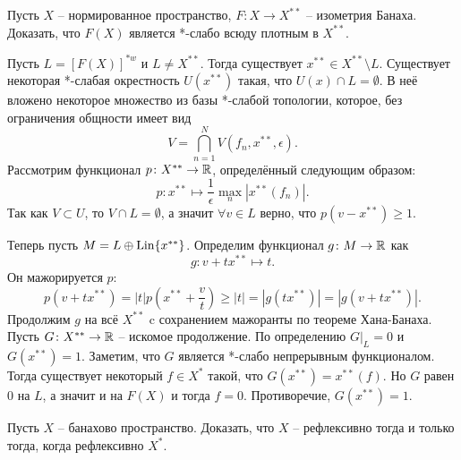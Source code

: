 \begin{task}[T11]
    Пусть $X$ -- нормированное пространство, $F\colon X \to X^{**}$ -- изометрия Банаха.
    Доказать, что $F(X)$ является *-слабо всюду плотным в $X^{**}$.
\end{task}
\begin{solution}
    Пусть $L = [F(X)]^{*w}$ и $L \neq X^{**}$.
    Тогда существует $x^{**} \in X^{**} \setminus L$.
    Существует некоторая *-слабая окрестность $U(x^{**})$ такая, что $U(x) \cap L = \emptyset$.
    В неё вложено некоторое множество из базы *-слабой топологии, которое, без ограничения общности имеет вид
    \[
        V = \bigcap_{n = 1}^{N} V(f_n, x^{**}, \epsilon).
    \]
    Рассмотрим функционал $p\colon X^{**} \to \mathbb{R}$, определённый следующим образом:
    \[
        p\colon x^{**} \mapsto \frac{1}{\epsilon} \max_{n} |x^{**}(f_n)|.
    \]
    Так как $V \subset U $, то $V \cap L = \emptyset$, а значит $\forall v \in L$ верно, что $p(v - x^{**}) \geq 1$.

    Теперь пусть $M = L \oplus \operatorname{Lin}\{x^{**}\}$.
    Определим функционал $g\colon M \to \mathbb{R}$ как
    \[
        g\colon v + tx^{**} \mapsto t.
    \]
    Он мажорируется $p\colon$
    \[
        p(v + tx^{**}) = |t|p\left(x^{**} + \frac{v}{t}\right) \geq |t| = |g(tx^{**})| = |g(v + tx^{**})|.
    \]
    Продолжим $g$ на всё $X^{**}$ c сохранением мажоранты по теореме Хана-Банаха.
    Пусть $G\colon X^{**} \to \mathbb{R}$ -- искомое продолжение.
    По определению $G|_{L} = 0$ и $G(x^{**}) = 1$.
    Заметим, что $G$ является *-слабо непрерывным функционалом.
    Тогда существует некоторый $f \in X^{*}$ такой, что $G(x^{**}) = x^{**}(f)$.
    Но $G$ равен $0$ на $L$, а значит и на $F(X)$ и тогда $f = 0$.
    Противоречие, $G(x^{**}) = 1$.

\end{solution}
\begin{task}[T12] %
    Пусть $X$ -- банахово пространство.
    Доказать, что $X$ -- рефлексивно тогда и только тогда, когда рефлексивно $X^*$.
\end{task}
